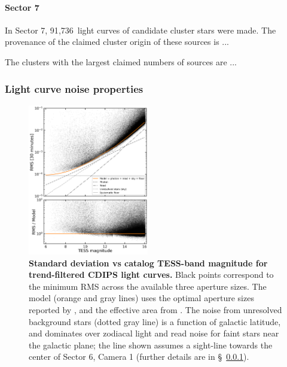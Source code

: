 \documentclass[12pt,twocolumn,tighten]{aastex62}
\newcommand{\sVIInumberlcs}{91{,}736\ }  %
\begin{document}
\paragraph{Sector 7}
In Sector 7, \sVIInumberlcs light curves of candidate cluster stars
were made. The provenance of the claimed cluster origin of these
sources is  ...

The clusters with the largest claimed numbers of sources are ...


\subsubsection{Light curve noise properties}
\label{subsubsec:rmsvsmag}

\begin{figure}[t]
	\begin{center}
		\leavevmode
		\includegraphics[width=0.47\textwidth]{rms_vs_mag.png}
	\end{center}
	\vspace{-0.5cm}
  \caption{ {\bf Standard deviation vs catalog TESS-band magnitude for
  trend-filtered CDIPS light curves.} 
  Black points correspond to the minimum RMS across the available three
  aperture sizes.  
  The model (orange and gray lines) uses the optimal aperture sizes reported 
  by \citet{Sullivan_et_al_2015}, and the effective area from 
  \citet{vanderspek_2018}.
  The noise from unresolved background stars (dotted gray line) is a function 
  of galactic latitude, and dominates over zodiacal light and read noise
  for faint stars near the galactic plane; the line shown assumes a
  sight-line towards the center of Sector 6, Camera 1 (further details
  are in \S~\ref{subsubsec:rmsvsmag}).
		\label{fig:rms_vs_mag}
	}
\end{figure}
\end{document}
